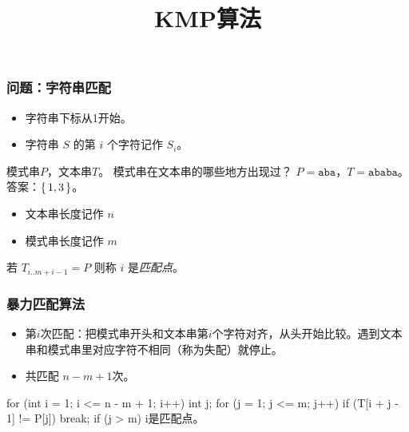 \documentclass{ctexbeamer}
\newcommand{\str}[1]{\texttt{#1}}
\begin{document}
\title{KMP算法}
\maketitle

\begin{frame}[fragile]
	\frametitle{问题：字符串匹配}

\begin{itemize}
\item 字符串下标从1开始。
\item 字符串 $S$ 的第 $i$ 个字符记作 $S_i$。
\end{itemize}

    模式串$P$，文本串$T$。
    模式串在文本串的哪些地方出现过？
    $P=\str{aba}$，$T=\str{ababa}$。答案：$\set{1, 3}$。

\begin{itemize}
\item 文本串长度记作 $n$
\item 模式串长度记作 $m$
\end{itemize}

若 $T_{i..m+i-1} = P$ 则称 $i$ 是\emph{匹配点}。

\end{frame}


\begin{frame}[fragile]
\frametitle{暴力匹配算法}

\begin{itemize}
\item 第$i$次匹配：把模式串开头和文本串第$i$个字符对齐，从头开始比较。遇到文本串和模式串里对应字符不相同（称为失配）就停止。
\item 共匹配 $n-m+1$次。
\end{itemize}


\begin{cverb}
for (int i = 1; i <= n - m + 1; i++) {
  int j;
  for (j = 1; j <= m; j++)
    if (T[i + j - 1] != P[j]) break;
  if (j > m)
    i是匹配点。
}
\end{cverb}

\end{frame}
\end{document}
